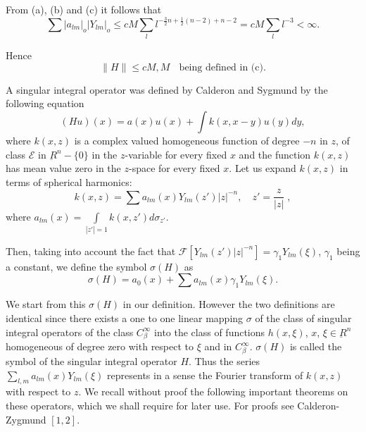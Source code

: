 From (a), (b) and (c) it follows that 
$$
\sum | a_{lm}|_o |Y_{lm}|_o \leq c M \sum_{l} l^{-\frac{3}{2}n+
  \frac{1}{2}(n-2) +n -2} = c M \sum_l l^{-3} < \infty. 
$$ 

Hence 
$$
\parallel H \parallel \leq c M, M \; \text{~ being defined in (c)}. 
$$ 

A singular integral operator was defined by Calderon and Sygmund by
the following equation 
\begin{equation*}
(Hu) (x) = a(x) u(x) + \int k(x, x-y) u (y) dy,
  \tag{4.10}\label{chap3-eq4.10} 
\end{equation*}
where $k(x, z)$ is a complex valued homogeneous function of degree
$-n$ in $z$, of class $\mathscr{E}$ in $ \underbar{R}^n -\{ 0 \}$ in
the $z$-variable for every fixed $x$ and the function $k(x, z)$ has
mean value zero in the $z$-space for every fixed $x$. Let us expand $ k
(x, z)$ in terms of spherical harmonics:  
$$
k(x, z) = \sum a_{lm}(x) Y_{lm} (z') |z|^{-n}, \quad z' = \frac{z}{| z |}\;, 
$$
where $a_{lm} (x) = \int \limits_{| z' | = 1} k (x, z' ) d \sigma _{z'}$. 

Then, taking into account the fact that 
$ \mathscr{F} [Y_{lm}(z' )|z|^{-n} ] = \gamma_1 Y_{lm} (\xi )$,\pageoriginale
$\gamma_1$ being a constant, we define the symbol $\sigma (H)$ as  
\begin{equation*}
\sigma (H) = a_0 (x) + \sum a_{lm} (x) \gamma_1 Y_{lm} (\xi
). \tag{4.11}\label{chap3-eq4.11} 
\end{equation*}

We start from this $\sigma(H)$ in our definition. However the two
definitions are identical since there exists a one to one linear
mapping $\sigma$ of the class of singular integral operators of the
class $C^\infty _\beta$ into the class of functions $ h(x, \xi)$,
$x$, $\xi \in \underbar{R}^n$ homogeneous of degree zero with respect
to $\xi$ and in $ C^\infty_\beta$. $\sigma (H)$ is called the symbol
of the singular integral operator $H$. Thus the series $
\sum\limits_{l, m} a_{lm}(x) Y_{lm} (\xi)$ represents in a sense the 
Fourier transform of $k(x, z)$ with respect to $z$. We recall without
proof the following important theorems on these operators, which we
shall require for later use. For proofs see Calderon-Zygmund $[1,2]$.  

